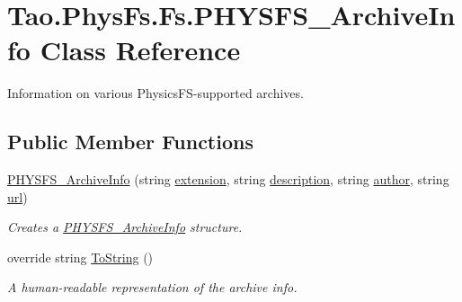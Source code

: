 \hypertarget{class_tao_1_1_phys_fs_1_1_fs_1_1_p_h_y_s_f_s___archive_info}{
\section{Tao.PhysFs.Fs.PHYSFS\_\-ArchiveInfo Class Reference}
\label{class_tao_1_1_phys_fs_1_1_fs_1_1_p_h_y_s_f_s___archive_info}
}


Information on various PhysicsFS-\/supported archives.  


\subsection*{Public Member Functions}
\begin{DoxyCompactItemize}
\item 
\hyperlink{class_tao_1_1_phys_fs_1_1_fs_1_1_p_h_y_s_f_s___archive_info_aa530ebdb1654e71f42e77dffd1b35e28}{PHYSFS\_\-ArchiveInfo} (string \hyperlink{class_tao_1_1_phys_fs_1_1_fs_1_1_p_h_y_s_f_s___archive_info_a801e286a7debe951b5f08f06bb9210f6}{extension}, string \hyperlink{class_tao_1_1_phys_fs_1_1_fs_1_1_p_h_y_s_f_s___archive_info_a22469d7b75eafcd56c38f0a83b61e39b}{description}, string \hyperlink{class_tao_1_1_phys_fs_1_1_fs_1_1_p_h_y_s_f_s___archive_info_a32d50255676604657813f451b7b9b920}{author}, string \hyperlink{class_tao_1_1_phys_fs_1_1_fs_1_1_p_h_y_s_f_s___archive_info_a48d8670b8cee012fe535b64f6234a068}{url})
\begin{DoxyCompactList}\small\item\em Creates a \hyperlink{class_tao_1_1_phys_fs_1_1_fs_1_1_p_h_y_s_f_s___archive_info}{PHYSFS\_\-ArchiveInfo} structure. \item\end{DoxyCompactList}\item 
override string \hyperlink{class_tao_1_1_phys_fs_1_1_fs_1_1_p_h_y_s_f_s___archive_info_a897018c3ccf82592fa2929b7530cb848}{ToString} ()
\begin{DoxyCompactList}\small\item\em A human-\/readable representation of the archive info. \item\end{DoxyCompactList}\end{DoxyCompactItemize}
